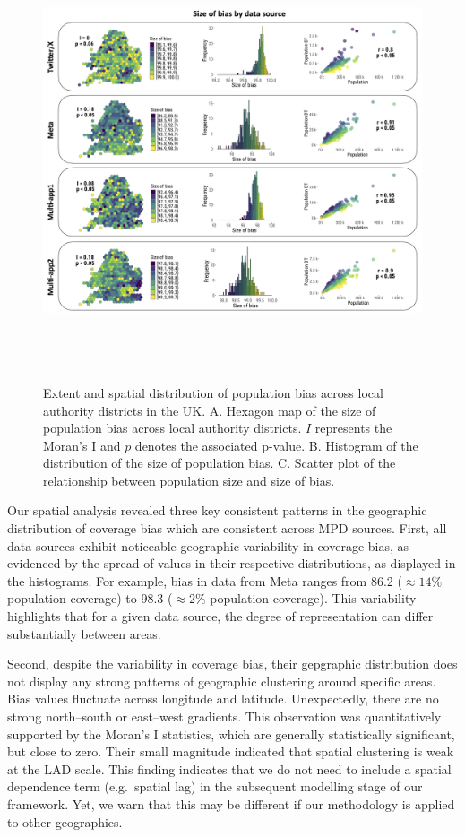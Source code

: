 \documentclass[]{rsos}%
\begin{document}
\begin{figure}
\centering
\includegraphics[width=14cm,height=13cm]{figures/Fig-size-bias.png}
\caption{Extent and spatial distribution of population bias across local
authority districts in the UK. A. Hexagon map of the size of population
bias across local authority districts. \(I\) represents the Moran's I
and \(p\) denotes the associated p-value. B. Histogram of the
distribution of the size of population bias. C. Scatter plot of the
relationship between population size and size of
bias.}\label{fig:bias-size}
\end{figure}

Our spatial analysis revealed three key consistent patterns in the geographic distribution of coverage bias which are consistent across MPD sources. First, all data sources exhibit noticeable geographic
variability in coverage bias, as evidenced by the spread of values in
their respective distributions, as displayed in the histograms.
For
example, bias in data from Meta ranges from 86.2 (\(\approx 14\%\)
population coverage) to 98.3 (\(\approx 2\%\) population coverage). This
variability highlights that for a given data source, the degree of
representation can differ substantially between areas.

Second, despite the variability in coverage bias, their gepgraphic distribution does not
display any strong patterns of geographic clustering around specific areas. Bias values fluctuate across longitude and latitude. Unexpectedly, there are no strong north--south or
east--west gradients. This observation was quantitatively supported by
the Moran's I statistics, which are generally statistically significant,
but close to zero. Their small magnitude indicated that spatial
clustering is weak at the LAD scale. This finding indicates that we do not need to include a spatial dependence term (e.g.~spatial lag) in
the subsequent modelling stage of our framework. Yet, we warn that this may be different if our methodology is applied to other geographies.
\end{document}
